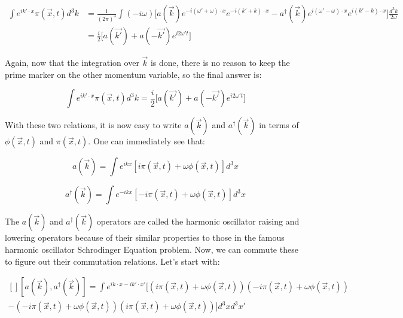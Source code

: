 \documentclass{article}
\begin{document}
    \begin{equation} 
        \begin{aligned}
            \int e^{i k' \cdot x} \pi (\vec{x}, t) d^{3}k & = \frac{1}{(2 \pi)^3} \int (- i \omega) \Big[ a(\vec{k}) e^{-i (\omega' + \omega) \cdot x} e^{-i (k' + k) \cdot x} - a^{\dag}(\vec{k}) e^{i (\omega' - \omega) \cdot x} e^{i (k' - k) \cdot x} \Big] \frac{d^3k}{2 \omega} \\
            & = \frac{i}{2} \big[ a(\vec{k'}) + a(-\vec{k'}) e^{i 2 \omega' t} \big]
        \end{aligned}
    \end{equation}

    Again, now that the integration over $\vec{k}$ is done, there is no reason to keep the prime marker on the other momentum variable, so the final answer is:

    \begin{equation}
        \int e^{i k' \cdot x} \pi (\vec{x}, t) d^{3}k = \frac{i}{2} \big[ a(\vec{k'}) + a(-\vec{k'}) e^{i 2 \omega' t} \big]
    \end{equation}

    With these two relations, it is now easy to write $a(\vec{k})$ and $a^{\dag}(\vec{k})$ in terms of $\phi (\vec{x}, t)$ and $\pi (\vec{x}, t)$. One can immediately see that:

    \begin{framed}
        \begin{equation}
            a(\vec{k}) = \int e^{i k x} [i \pi (\vec{x}, t) + \omega \phi(\vec{x}, t)] d^{3} x
        \end{equation}
    \end{framed}

    \begin{framed}
        \begin{equation}
            a^{\dag}(\vec{k}) = \int e^{- i k x} [- i \pi (\vec{x}, t)+ \omega \phi(\vec{x}, t)] d^{3} x
        \end{equation}
    \end{framed}

    The $a(\vec{k})$ and $a^{\dag}(\vec{k})$ operators are called the harmonic oscillator raising and lowering operators because of their similar properties to
    those in the famous harmonic oscillator Schrodinger Equation problem. Now, we can commute these to figure out their commutation relations. Let's start with:

    \begin{equation}
        \begin{aligned}[]
        [a(\vec{k}), a^{\dag}(\vec{k})] = \int e^{i k \cdot x - i k' \cdot x'} [(i \pi (\vec{x}, t) + \omega \phi(\vec{x}, t))(- i \pi (\vec{x}, t)+ \omega \phi(\vec{x}, t)) \\ 
        - (- i \pi (\vec{x}, t)+ \omega \phi(\vec{x}, t))(i \pi (\vec{x}, t) + \omega \phi(\vec{x}, t))] d^{3} x d^{3} x'
        \end{aligned}
    \end{equation}
\end{document}
